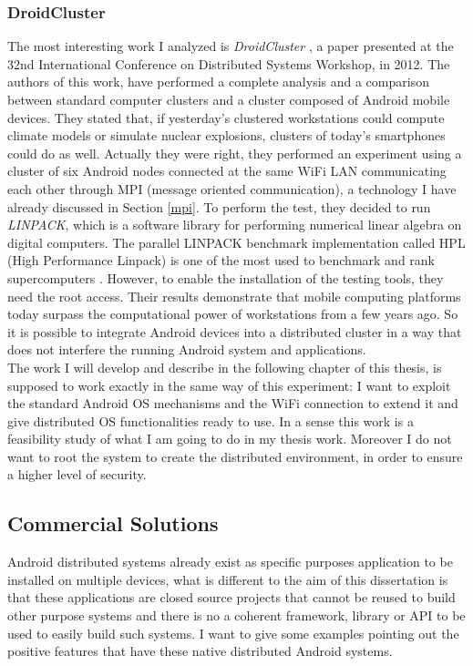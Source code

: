 \subsubsection{DroidCluster}
The most interesting work I analyzed is \textit{DroidCluster} \cite{6258144}, a paper presented at the 32nd International Conference on Distributed Systems Workshop, in 2012. The authors of this work, have performed a complete analysis and a comparison between standard computer clusters and a cluster composed of Android mobile devices. They stated that, if yesterday's clustered workstations could compute climate models or simulate nuclear explosions, clusters of today's smartphones could do as well. Actually they were right, they performed an experiment using a cluster of six Android nodes connected at the same WiFi LAN communicating each other through MPI (message oriented communication), a technology I have already discussed in Section \ref{mpi}. To perform the test, they decided to run \textit{LINPACK}, which is a software library for performing numerical linear algebra on digital computers. The parallel LINPACK benchmark implementation called HPL (High Performance Linpack) is one of the most used to benchmark and rank supercomputers \cite{jan2005sidebar}. However, to enable the installation of the testing tools, they need the root access. Their results demonstrate that mobile computing platforms today surpass the computational power of workstations from a few years ago. So it is possible to integrate Android devices into a distributed cluster in a way that does not interfere the running Android system and applications.\\
The work I will develop and describe in the following chapter of this thesis, is supposed to work exactly in the same way of this experiment: I want to exploit the standard Android OS mechanisms and the WiFi connection to extend it and give distributed OS functionalities ready to use. In a sense this work is a feasibility study of what I am going to do in my thesis work. Moreover I do not want to root the system to create the distributed environment, in order to ensure a higher level of security.
\subsection{Commercial Solutions}
Android distributed systems already exist as specific purposes application to be installed on multiple devices, what is different to the aim of this dissertation is that these applications are closed source projects that cannot be reused to build other purpose systems and there is no a coherent framework, library or API to be used to easily build such systems.
I want to give some examples pointing out the positive features that have these native distributed Android systems.
